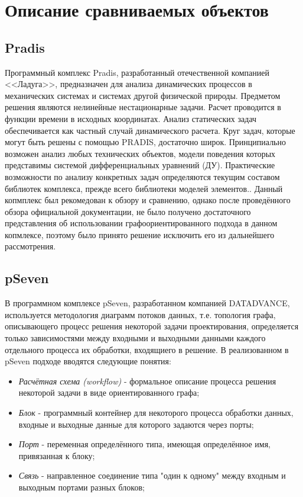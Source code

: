 \section{Описание сравниваемых объектов}
\subsection{Pradis}
Программный комплекс Pradis, разработанный отечественной компанией <<Ладуга>>, предназначен для анализа динамических процессов в механических системах и системах другой физической природы. Предметом решения являются  нелинейные нестационарные задачи. Расчет проводится в функции времени в исходных координатах. Анализ статических задач обеспечивается как частный случай динамического расчета. Круг задач, которые могут быть решены с помощью PRADIS, достаточно широк. Принципиально возможен анализ любых технических объектов, модели поведения которых представимы системой дифференциальных уравнений (ДУ). Практические возможности по анализу конкретных задач определяются текущим составом библиотек комплекса, прежде всего библиотеки моделей элементов.\cite{PradisGeneral2007}. Данный копмплекс был рекомедован к обзору и сравнению, однако после проведённого обзора официальной документации\cite{PradisMethods2007}, не было получено достаточного представления об использовании графоориентированного подхода в данном копмлексе, поэтому было принято решение исключить его из дальнейшего рассмотрения.

\subsection{pSeven}
В программном комплексе pSeven, разработанном компанией DATADVANCE, используется методология диаграмм потоков данных, т.е. топология графа, описывающего процесс решения некоторой задачи проектирования, определяется только зависимостями между входными и выходными данными каждого отдельного процесса их обработки, входящиего в решение. \cite{Nazarenko2015} В реализованном в pSeven подходе вводятся следующие понятия:
\begin{itemize}
    \item \emph{Расчётная схема (workflow)} - формальное описание процесса решения некоторой задачи в виде ориентированного графа;
    \item \emph{Блок} - программный контейнер для некоторого процесса обработки данных, входные и выходные данные для которого задаются через порты;
    \item \emph{Порт} - переменная определённого типа, имеющая определённое имя, привязанная к блоку;
    \item \emph{Связь} - направленное соединение типа "один к одному" между входным и выходным портами разных блоков;
\end{itemize}

